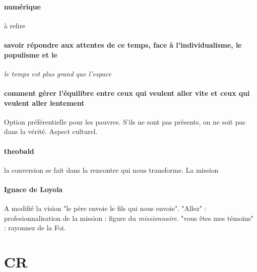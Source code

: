 \paragraph{numérique} à relire

\paragraph{savoir répondre aux attentes de ce temps, face à l'individualisme, le populisme et le } \textit{le temps est plus grand que l'espace}

\paragraph{comment gérer l'équilibre entre ceux qui veulent aller vite et ceux qui veulent aller lentement }  Option préférentielle pour les pauvres. S'ils ne sont pas présents, on ne soit pas dans la vérité. Aspect culturel.

\paragraph{theobald} la conversion se fait dans la rencontre qui nous transforme. La mission

\paragraph{Ignace de Loyola} A modifié la vision "le père envoie le fils qui nous envoie". "Allez" : profesionnalisation de la mission : figure du \textit{missionnaire}. "vous êtes mes témoins" : rayonnez de la Foi.


\section{CR}

